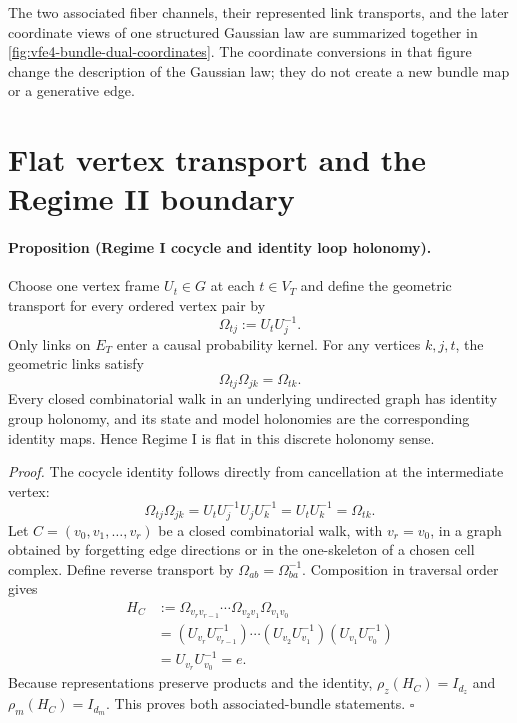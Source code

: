 The two associated fiber channels, their represented link transports, and the later coordinate views of one structured Gaussian law are summarized together in \cref{fig:vfe4-bundle-dual-coordinates}. The coordinate conversions in that figure change the description of the Gaussian law; they do not create a new bundle map or a generative edge.

\section{Flat vertex transport and the Regime II boundary}

\paragraph{Proposition (Regime I cocycle and identity loop holonomy).}
Choose one vertex frame $U_t\in G$ at each $t\in V_T$ and define the geometric transport for every ordered vertex pair by
\begin{equation}
\Omega_{tj}:=U_tU_j^{-1}.
\label{eq:regime-i-vertex-cocycle}
\end{equation}
Only links on $E_T$ enter a causal probability kernel.  For any vertices $k,j,t$, the geometric links satisfy
\begin{equation}
\Omega_{tj}\Omega_{jk}=\Omega_{tk}.
\label{eq:regime-i-cocycle-identity}
\end{equation}
Every closed combinatorial walk in an underlying undirected graph has identity group holonomy, and its state and model holonomies are the corresponding identity maps.  Hence Regime I is flat in this discrete holonomy sense.

\emph{Proof.}
The cocycle identity follows directly from cancellation at the intermediate vertex:
\begin{equation}
\Omega_{tj}\Omega_{jk}
=U_tU_j^{-1}U_jU_k^{-1}
=U_tU_k^{-1}
=\Omega_{tk}.
\label{eq:regime-i-cocycle-proof}
\end{equation}
Let $C=(v_0,v_1,\ldots,v_r)$ be a closed combinatorial walk, with $v_r=v_0$, in a graph obtained by forgetting edge directions or in the one-skeleton of a chosen cell complex.  Define reverse transport by $\Omega_{ab}=\Omega_{ba}^{-1}$.  Composition in traversal order gives
\begin{equation}
\begin{aligned}
H_C
&:=\Omega_{v_rv_{r-1}}\cdots\Omega_{v_2v_1}\Omega_{v_1v_0}\\
&=(U_{v_r}U_{v_{r-1}}^{-1})\cdots
  (U_{v_2}U_{v_1}^{-1})(U_{v_1}U_{v_0}^{-1})\\
&=U_{v_r}U_{v_0}^{-1}
=e.
\end{aligned}
\label{eq:regime-i-loop-holonomy}
\end{equation}
Because representations preserve products and the identity, $\rho_z(H_C)=I_{d_z}$ and $\rho_m(H_C)=I_{d_m}$.  This proves both associated-bundle statements.  \hfill$\square$

